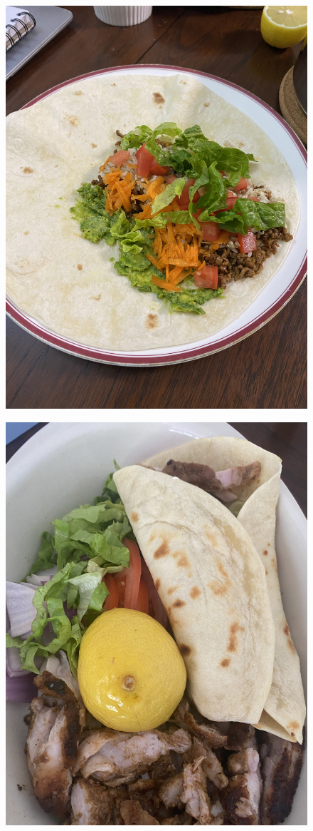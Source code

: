 \documentclass[]{article}
\begin{document}
\newpage\begin{figure}[H]
\begin{center}\hyperref[rec:Beef Burritos]{\includegraphics[keepaspectratio,width=\textheight,height=\textwidth,angle=-90]{Gallery/Beef Burritos}}\caption*{}\label{fig:Beef Burritos}\end{center}
\end{figure}
\newpage\begin{figure}[H]
\begin{center}\hyperref[rec:Chicken Shawarma]{\includegraphics[keepaspectratio,width=\textheight,height=\textwidth,angle=-90]{Gallery/Chicken Shawarma}}\caption*{}\label{fig:Chicken Shawarma}\end{center}
\end{figure}
\end{document}
